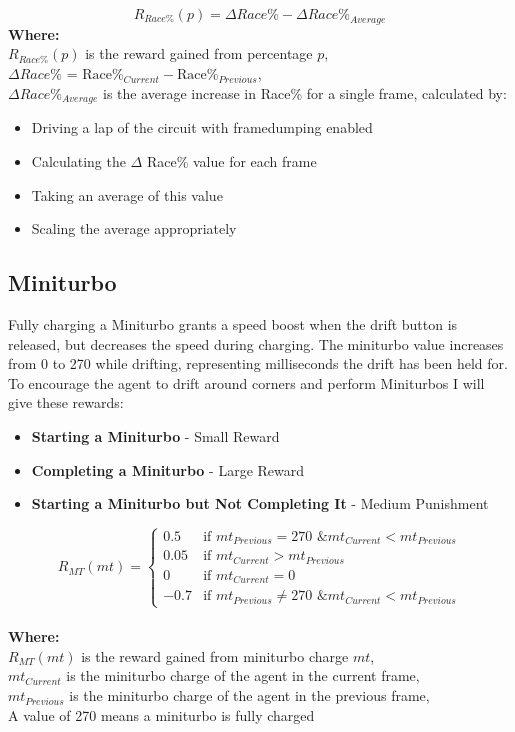 \documentclass{article}
\begin{document}
\[
R_{Race\%}(p) = \Delta Race\%  - \Delta Race\%_{Average}
\]
\textbf{Where:}\\ $R_{Race\%}(p)$ is the reward gained from percentage $p$,
\\$\Delta Race\%$ = $\text{Race\%}_{Current} - \text{Race\%}_{Previous}$,
\\$\Delta Race\%_{Average}$ is the average increase in Race\% for a single frame, calculated by:
\begin{itemize}
    \renewcommand{\labelitemi}{-}
    \item Driving a lap of the circuit with framedumping enabled
    \item Calculating the $\Delta$ Race\% value for each frame
    \item Taking an average of this value
    \item Scaling the average appropriately
\end{itemize}

\subsection{Miniturbo}
Fully charging a Miniturbo grants a speed boost when the drift button is released, but decreases the speed during charging. The miniturbo value increases from 0 to 270 while drifting, representing milliseconds the drift has been held for. To encourage the agent to drift around corners and perform Miniturbos I will give these rewards:
\begin{itemize}
    \item \textbf{Starting a Miniturbo} - Small Reward
    \item \textbf{Completing a Miniturbo} - Large Reward
    \item \textbf{Starting a Miniturbo but Not Completing It} - Medium Punishment
\end{itemize}
\[
R_{MT}(mt) =
\begin{cases}
  0.5 & \text{if } mt_{Previous} = 270 \text{ \& } mt_{Current} < mt_{Previous}\\ %
  0.05 & \text{if } mt_{Current} > mt_{Previous}\\ %
  0 & \text{if } mt_{Current} = 0\\ %
  -0.7 & \text{if } mt_{Previous} \neq 270 \text{ \& } mt_{Current} < mt_{Previous}  %
\end{cases}
\]
\\
\textbf{Where:}\\ $R_{MT}(mt)$ is the reward gained from miniturbo charge $mt$,
\\$mt_{Current}$ is the miniturbo charge of the agent in the current frame,
\\$mt_{Previous}$ is the miniturbo charge of the agent in the previous frame,
\\A value of 270 means a miniturbo is fully charged
\end{document}
